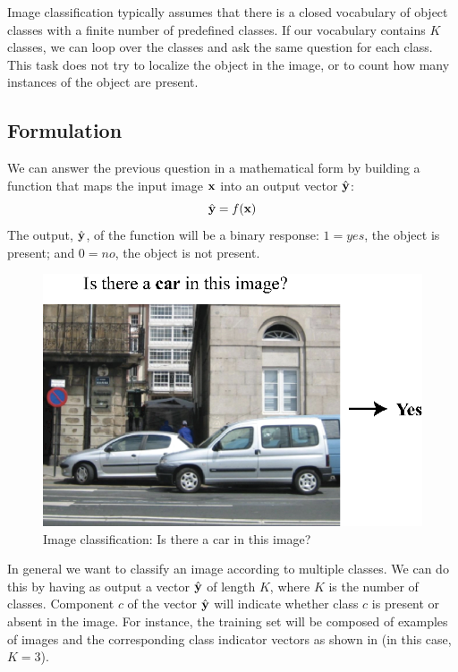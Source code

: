Image classification typically assumes that there is a closed vocabulary of object classes with a finite number of predefined classes. If our vocabulary contains $K$ classes, we can loop over the classes and ask the same question for each class. This task does not try to localize the object in the image, or to count how many instances of the object are present.

\subsection{Formulation}
We can answer the previous question in a mathematical form by building a function that maps the input image ${\bf x}$ into an output vector $\hat {\bf y}$:
\begin{equation}
    \hat {\bf y} = f({\bf x})
\end{equation}
The output, $\hat {\bf y}$, of the function will be a binary response: $1=yes$, the object is present; and $0=no$, the object is not present.

\begin{figure}
    \centerline{
        \includegraphics[width=0.5\linewidth]{figures/object_recognition/image_classification.eps}}
    \caption{Image classification: Is there a car in this image?}
\end{figure}


In general we want to classify an image according to multiple classes. We can do this by having as output a vector $\hat {\bf y}$ of length $K$, where $K$ is the number of classes. Component $c$ of the vector $\hat {\bf y}$ will indicate whether class $c$ is present or absent in the image. For instance, the training set will be composed of examples of images and the corresponding class indicator vectors as shown in \fig{\ref{fig:classification_training_set}} (in this case, $K=3$).

